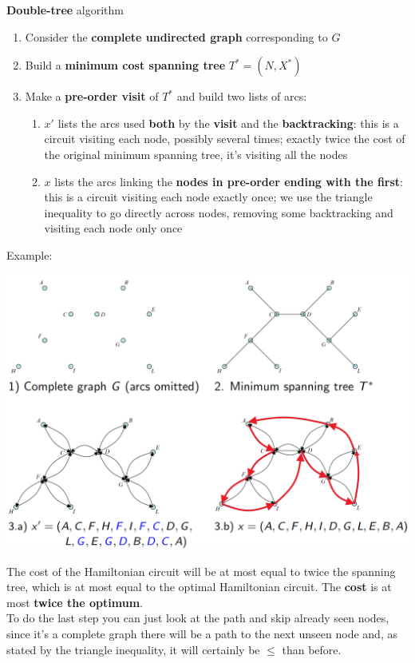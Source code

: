 \textbf{Double-tree} algorithm
\begin{enumerate}
	\item Consider the \textbf{complete undirected graph} corresponding to $G$
	\item Build a \textbf{minimum cost spanning tree} $T^\ast = (N, X^\ast)$
	\item Make a \textbf{pre-order visit} of $T^\ast$ and build two lists of arcs:
	\begin{enumerate}[label=\alph*.]
		\item $x'$ lists the arcs used \textbf{both} by the \textbf{visit} and the \textbf{backtracking}: this is a circuit visiting each node, possibly several times; exactly twice the cost of the original minimum spanning tree, it's visiting all the nodes
		\item $x$ lists the arcs linking the \textbf{nodes in pre-order ending with the first}: this is a circuit visiting each node exactly once; we use the triangle inequality to go directly across nodes, removing some backtracking and visiting each node only once
	\end{enumerate}
\end{enumerate}

Example:
\begin{center}
	\includegraphics[width=0.8\columnwidth]{img/TSTTI1}
\end{center}

\newpage

The cost of the Hamiltonian circuit will be at most equal to twice the spanning tree, which is at most equal to the optimal Hamiltonian circuit. The \textbf{cost} is at most \textbf{twice the optimum}. \\

To do the last step you can just look at the path and skip already seen nodes, since it's a complete graph there will be a path to the next unseen node and, as stated by the triangle inequality, it will certainly be $\leq$ than before. \\


